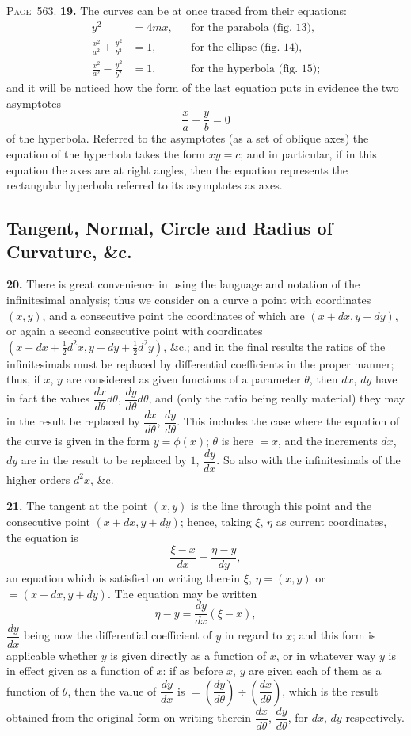 \documentclass[11pt,a4paper]{book}
\begin{document}
\newpage
\noindent\textsc{Page~563.} \textbf{19.} The curves can be at once traced from their equations:
\begin{align*}
y^2 &= 4mx, && \text{for the parabola (fig.~13),}\\
\frac{x^2}{a^2}+\frac{y^2}{b^2} &= 1, && \text{for the ellipse (fig.~14),}\\
\frac{x^2}{a^2}-\frac{y^2}{b^2} &= 1, && \text{for the hyperbola (fig.~15);}
\end{align*}
and it will be noticed how the form of the last equation puts in evidence the two asymptotes
\[
\frac{x}{a}\pm\frac{y}{b}=0
\]
of the hyperbola. Referred to the asymptotes (as a set of oblique axes) the equation of the hyperbola takes the form $xy=c$; and in particular, if in this equation the axes are at right angles, then the equation represents the rectangular hyperbola referred to its asymptotes as axes.

\subsection*{Tangent, Normal, Circle and Radius of Curvature, \&c.}

\textbf{20.} There is great convenience in using the language and notation of the infinitesimal analysis; thus we consider on a curve a point with coordinates $(x,y)$, and a consecutive point the coordinates of which are $(x+dx, y+dy)$, or again a second consecutive point with coordinates $(x+dx+\tfrac12d^2x, y+dy+\tfrac12d^2y)$, \&c.; and in the final results the ratios of the infinitesimals must be replaced by differential coefficients in the proper manner; thus, if $x$, $y$ are considered as given functions of a parameter $\theta$, then $dx$, $dy$ have in fact the values $\dfrac{dx}{d\theta}d\theta$, $\dfrac{dy}{d\theta}d\theta$, and (only the ratio being really material) they may in the result be replaced by $\dfrac{dx}{d\theta}$, $\dfrac{dy}{d\theta}$. This includes the case where the equation of the curve is given in the form $y=\phi(x)$; $\theta$ is here $=x$, and the increments $dx$, $dy$ are in the result to be replaced by $1$, $\dfrac{dy}{dx}$. So also with the infinitesimals of the higher orders $d^2x$, \&c.

\textbf{21.} The tangent at the point $(x,y)$ is the line through this point and the consecutive point $(x+dx, y+dy)$; hence, taking $\xi$, $\eta$ as current coordinates, the equation is
\[
\frac{\xi-x}{dx}=\frac{\eta-y}{dy},
\]
an equation which is satisfied on writing therein $\xi$, $\eta=(x,y)$ or $=(x+dx, y+dy)$. The equation may be written
\[
\eta-y=\frac{dy}{dx}(\xi-x),
\]
$\dfrac{dy}{dx}$ being now the differential coefficient of $y$ in regard to $x$; and this form is applicable whether $y$ is given directly as a function of $x$, or in whatever way $y$ is in effect given as a function of $x$: if as before $x$, $y$ are given each of them as a function of $\theta$, then the value of $\dfrac{dy}{dx}$ is $=\left(\dfrac{dy}{d\theta}\right)\div\left(\dfrac{dx}{d\theta}\right)$, which is the result obtained from the original form on writing therein $\dfrac{dx}{d\theta}$, $\dfrac{dy}{d\theta}$, for $dx$, $dy$ respectively.
\end{document}
